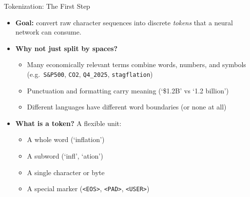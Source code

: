 \begin{frame}{Tokenization: The First Step}
\begin{itemize}
\item \textbf{Goal:} convert raw character sequences into discrete \emph{tokens} that a neural network can consume.

\medskip
\item \textbf{Why not just split by spaces?}
\begin{itemize}
    \item Many economically relevant terms combine words, numbers, and symbols (e.g.\ \texttt{S\&P500}, \texttt{CO2}, \texttt{Q4\_2025}, \texttt{stagflation})
    \item Punctuation and formatting carry meaning (`\$1.2B' vs `1.2 billion')
    \item Different languages have different word boundaries (or none at all)
\end{itemize}

\medskip
\item \textbf{What is a token?} A flexible unit:
\begin{itemize}
    \item A whole word (`inflation')
    \item A subword (`infl', `ation')
    \item A single character or byte
    \item A special marker (\texttt{<EOS>}, \texttt{<PAD>}, \texttt{<USER>})
\end{itemize}
\end{itemize}
\end{frame}

